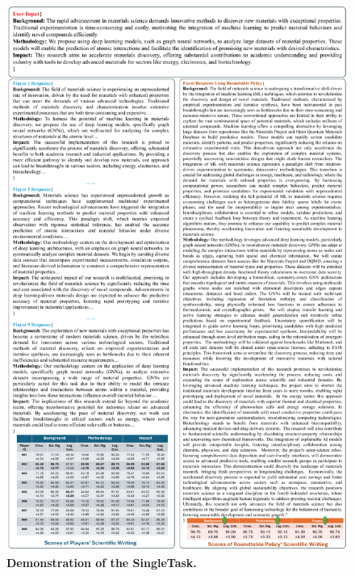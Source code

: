 
\clearpage
\begin{figure}
    \centering
    \includegraphics[width=1.\textwidth]{figures/detailed_demo/singletask_demo.pdf}
    \caption{\label{fig:singletask_demo} \textbf{Demonstration of the SingleTask.}}
\end{figure}
\clearpage
